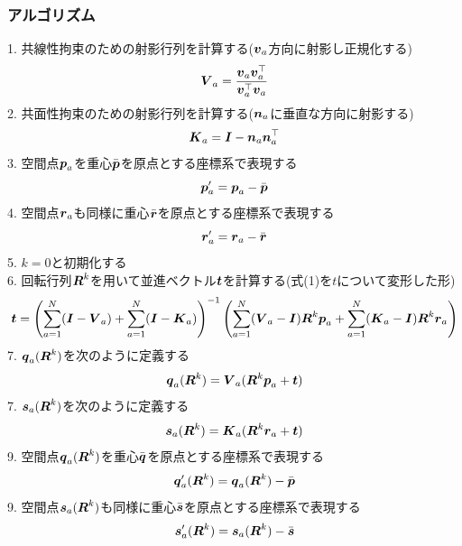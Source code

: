 \documentclass[]{jarticle}          %
\begin{document}
\subsubsection{アルゴリズム}
1. 共線性拘束のための射影行列を計算する($\vU_a$方向に射影し正規化する) \\ 
\begin{equation}
  \VU_a = \frac{\vU_a\vU_a^\top}{\vU_a^\top\vU_a}
\end{equation}
2. 共面性拘束のための射影行列を計算する($\nU_a$に垂直な方向に射影する) \\
\begin{equation}
  \KU_a = \IU - \nU_a\nU_a^\top
\end{equation}
3. 空間点$\pU_a$を重心$\bar{\pU}$を原点とする座標系で表現する \\
\begin{equation}
  \pU'_a = \pU_a - \bar{\pU}
\end{equation}
4. 空間点$\rU_a$も同様に重心$\bar{\rU}$を原点とする座標系で表現する \\
\begin{equation}
  \rU'_a = \rU_a - \bar{\rU}
\end{equation}
5. $k=0$と初期化する \\
6. 回転行列$\RU^k$を用いて並進ベクトル$\tU$を計算する(式(1)を$t$について変形した形) \\
\begin{equation}
  \tU = \left(\sum^N_{a=1}(\IU-\VU_a)+\sum^N_{a=1}(\IU-\KU_a)\right)^{-1}\left(\sum^N_{a=1}(\VU_a-\IU)\RU^k\pU_a+\sum^N_{a=1}(\KU_a-\IU)\RU^k\rU_a\right)
\end{equation}
7. $\qU_a(\RU^k)$を次のように定義する \\
\begin{equation}
  \qU_a(\RU^k)=\VU_a(\RU^k\pU_a+\tU)
\end{equation}
7. $\sU_a(\RU^k)$を次のように定義する \\
\begin{equation}
  \sU_a(\RU^k)=\KU_a(\RU^k\rU_a+\tU)
\end{equation}
9. 空間点$\qU_a(\RU^k)$を重心$\bar{\qU}$を原点とする座標系で表現する \\
\begin{equation}
  \qU'_a(\RU^k) = \qU_a(\RU^k) - \bar{\pU}
\end{equation}
9. 空間点$\sU_a(\RU^k)$も同様に重心$\bar{\sU}$を原点とする座標系で表現する \\
\begin{equation}
  \sU'_a(\RU^k) = \sU_a(\RU^k) - \bar{\sU}
\end{equation}
\end{document}

